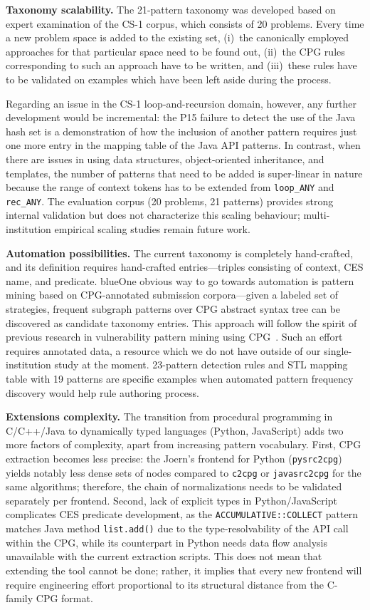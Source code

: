 \textbf{Taxonomy scalability.} The 21-pattern taxonomy was developed based on expert examination of the CS-1 corpus, which consists of 20 problems. Every time a new problem space is added to the existing set, (i)~the canonically employed approaches for that particular space need to be found out, (ii)~the CPG rules corresponding to such an approach have to be written, and (iii)~these rules have to be validated on examples which have been left aside during the process. {Regarding an issue in the CS-1 loop-and-recursion domain, however, any further development would be incremental: the P15 failure to detect the use of the Java hash set is a demonstration of how the inclusion of another pattern requires just one more entry in the mapping table of the Java API patterns. In contrast, when there are issues in using data structures, object-oriented inheritance, and templates, the number of patterns that need to be added is super-linear in nature because the range of context tokens has to be extended from \texttt{loop\_ANY} and \texttt{rec\_ANY}. The evaluation corpus (20 problems, 21 patterns) provides strong internal validation but does not characterize this scaling behaviour; multi-institution empirical scaling studies remain future work.

\textbf{Automation possibilities.} The current taxonomy is completely hand-crafted, and its definition requires hand-crafted entries---triples consisting of context, CES name, and predicate. {blue}{One obvious way to go towards automation is pattern mining based on CPG-annotated submission corpora---given a labeled set of strategies, frequent subgraph patterns over CPG abstract syntax tree can be discovered as candidate taxonomy entries. This approach will follow the spirit of previous research in vulnerability pattern mining using CPG~\cite{ref_yamaguchi2014}.} Such an effort requires annotated data, a resource which we do not have outside of our single-institution study at the moment. 23-pattern detection rules and STL mapping table with 19 patterns are specific examples when automated pattern frequency discovery would help rule authoring process.

\textbf{Extensions complexity.} The transition from procedural programming in C/C++/Java to dynamically typed languages (Python, JavaScript) adds two more factors of complexity, apart from increasing pattern vocabulary. First, CPG extraction becomes less precise: the Joern's frontend for Python (\texttt{pysrc2cpg}) yields notably less dense sets of nodes compared to \texttt{c2cpg} or \texttt{javasrc2cpg} for the same algorithms; therefore, the chain of normalizations needs to be validated separately per frontend. Second, lack of explicit types in Python/JavaScript complicates CES predicate development, as the \texttt{ACCUMULATIVE::COLLECT} pattern matches Java method \texttt{list.add()} due to the type-resolvability of the API call within the CPG, while its counterpart in Python needs data flow analysis unavailable with the current extraction scripts. This does not mean that extending the tool cannot be done; rather, it implies that every new frontend will require engineering effort proportional to its structural distance from the C-family CPG format.


}
